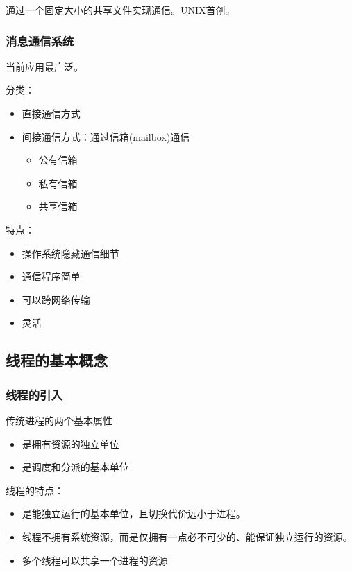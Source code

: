 \documentclass[12pt, a4paper, oneside]{ctexart}
\begin{document}
通过一个固定大小的共享文件实现通信。UNIX首创。

\subsubsection{消息通信系统}

当前应用最广泛。

分类：
\begin{itemize}
    \item 直接通信方式
    \item 间接通信方式：通过信箱(mailbox)通信
    \begin{itemize}
        \item 公有信箱
        \item 私有信箱
        \item 共享信箱
    \end{itemize}
\end{itemize}

特点：
\begin{itemize}
    \item 操作系统隐藏通信细节
    \item 通信程序简单
    \item 可以跨网络传输
    \item 灵活
\end{itemize}

\subsection{线程的基本概念}

\subsubsection{线程的引入}

传统进程的两个基本属性
\begin{itemize}
    \item 是拥有资源的独立单位
    \item 是调度和分派的基本单位
\end{itemize}

线程的特点：
\begin{itemize}
    \item 是能独立运行的基本单位，且切换代价远小于进程。
    \item 线程不拥有系统资源，而是仅拥有一点必不可少的、能保证独立运行的资源。
    \item 多个线程可以共享一个进程的资源
\end{itemize}
\end{document}

